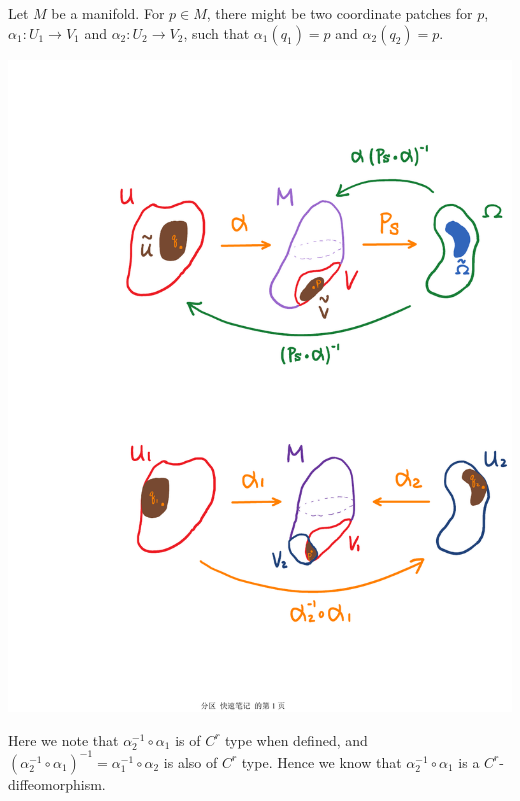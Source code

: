 \documentclass[11pt,oneside]{book}
\theoremstyle{break}
\theoremstyle{break}
\begin{document}
Let $M$ be a manifold. For $p\in M$, there might be two coordinate patches for $p$, $\alpha_1:U_1\to V_1$ and $\alpha_2:U_2\to V_2$, such that $\alpha_1(q_1) = p$ and $\alpha_2(q_2) = p$. 
\begin{center}
\includegraphics[scale=0.69]{coorPatch.pdf}
\end{center}
Here we note that $\alpha_2^{-1}\circ \alpha_1$ is of $C^r$ type when defined, and $(\alpha_2^{-1}\circ \alpha_1)^{-1} = \alpha_1^{-1} \circ \alpha_2$ is also of $C^r$ type. Hence we know that $\alpha_2^{-1}\circ \alpha_1$ is a $C^r$-diffeomorphism. \\
\end{document}
